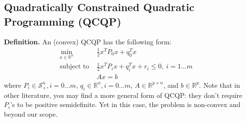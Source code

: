 \documentclass[
]{book}
\theoremstyle{definition}
\theoremstyle{definition}
\theoremstyle{definition}
\theoremstyle{definition}
\theoremstyle{remark}
\begin{document}
\subsection{Quadratically Constrained Quadratic Programming (QCQP)}\label{quadratically-constrained-quadratic-programming-qcqp}

\textbf{Definition.} An (convex) QCQP has the following form:
\begin{align}
   \label{eq:app-qcqpdef}
   \min_{x \in \mathbb{R}^n} \ & \frac{1}{2} x^T P_0 x + q_0^T x \\
   \text{subject to } & \frac{1}{2} x^T P_i x + q_i^T x + r_i \le 0, \ i = 1 \dots m \\
   & Ax = b
\end{align}
where \(P_i \in \mathcal{S}_+^n, i = 0 \dots m\), \(q_i \in \mathbb{R}^n, i = 0 \dots m\), \(A \in \mathbb{R}^{p \times n}\), and \(b \in \mathbb{R}^p\). Note that in other literature, you may find a more general form of QCQP: they don't require \(P_i\)'s to be positive semidefinite. Yet in this case, the problem is non-convex and beyond our scope.
\end{document}

